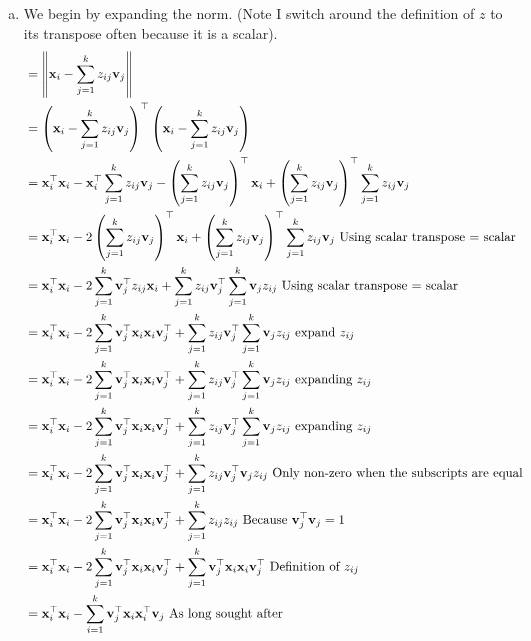 \documentclass[12pt,letterpaper,fleqn]{hmcpset}
\begin{document}
\begin{solution}
    \begin{enumerate}[(a)]
        \item
            We begin by expanding the norm. (Note I switch around the definition of $z$ to its transpose often because it is a scalar).
            \begin{align*}
                &= \norm{\xx_i - \sum_{j=1}^k z_{ij}\vv_j}\\
                &= \left(\xx_i - \sum_{j=1}^k z_{ij}\vv_j \right)^\T \left(\xx_i - \sum_{j=1}^k z_{ij}\vv_j \right)\\
                &= \xx_i^\T \xx_i -\xx_i^\T \sum_{j=1}^k z_{ij}\vv_j - \left( \sum_{j=1}^k z_{ij}\vv_j \right)^\T \xx_i + \left( \sum_{j=1}^k z_{ij}\vv_j \right)^\T \sum_{j=1}^k z_{ij}\vv_j\\
                &= \xx_i^\T \xx_i - 2 \left( \sum_{j=1}^k z_{ij}\vv_j \right)^\T \xx_i + \left( \sum_{j=1}^k z_{ij}\vv_j \right)^\T \sum_{j=1}^k z_{ij}\vv_j \text{ Using scalar transpose = scalar}\\     
                &= \xx_i^\T \xx_i - 2 \sum_{j=1}^k \vv_j^\T z_{ij} \xx_i + \sum_{j=1}^k z_{ij} \vv_j^\T  \sum_{j=1}^k \vv_j z_{ij} \text{ Using scalar transpose = scalar}\\
                &= \xx_i^\T \xx_i - 2 \sum_{j=1}^k \vv_j^\T \xx_i \xx_i \vv_j^\T+ \sum_{j=1}^k z_{ij} \vv_j^\T  \sum_{j=1}^k \vv_j z_{ij} \text{ expand $z_{ij}$ }\\
                &= \xx_i^\T \xx_i - 2 \sum_{j=1}^k \vv_j^\T \xx_i \xx_i \vv_j^\T+ \sum_{j=1}^k z_{ij} \vv_j^\T  \sum_{j=1}^k \vv_j z_{ij} \text{ expanding $z_{ij}$ }\\
                &= \xx_i^\T \xx_i - 2 \sum_{j=1}^k \vv_j^\T \xx_i \xx_i \vv_j^\T+ \sum_{j=1}^k z_{ij} \vv_j^\T  \sum_{j=1}^k \vv_j z_{ij} \text{ expanding $z_{ij}$ }\\
                &= \xx_i^\T \xx_i - 2 \sum_{j=1}^k \vv_j^\T \xx_i \xx_i \vv_j^\T+ \sum_{j=1}^k z_{ij} \vv_j^\T \vv_j z_{ij} \text{ Only non-zero when the subscripts are equal }\\
                &= \xx_i^\T \xx_i - 2 \sum_{j=1}^k \vv_j^\T \xx_i \xx_i \vv_j^\T+ \sum_{j=1}^k z_{ij} z_{ij} \text{ Because $\vv_j^\T \vv_j = 1$ }\\
                &= \xx_i^\T \xx_i - 2 \sum_{j=1}^k \vv_j^\T \xx_i \xx_i \vv_j^\T+ \sum_{j=1}^k \vv_j^\T \xx_i \xx_i \vv_j^\T \text{ Definition of $z_{ij}$ }\\
                &= \xx_i^\T\xx_i - \sum_{i=1}^k\vv_j^\T \xx_i\xx_i^\T \vv_j \text{ As long sought after}

\end{align*}
\end{enumerate}
\end{solution}
\end{document}
